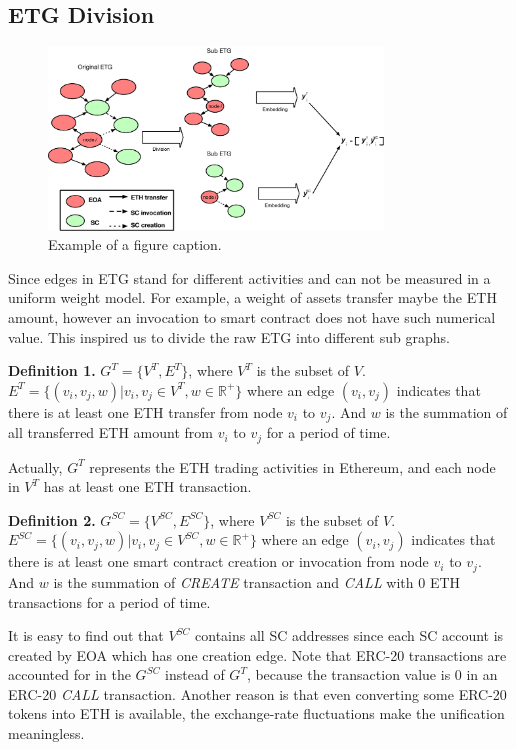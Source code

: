 \subsection{ETG Division}

\begin{figure}[htbp]
	\centering
	\label{fig_graph_split}
	\includegraphics[width=3.5in]{fig/graph_split.eps}
	\caption{Example of a figure caption.}
\end{figure}

Since edges in ETG stand for different activities and can not be measured in a uniform weight model. For example, a weight of assets transfer maybe the ETH amount, however an invocation to smart contract does not have such numerical value. This inspired us to divide the raw ETG into different sub graphs.

\textbf{Definition 1.} $G^{T}=\{V^T,E^T\}$, where $V^T$ is the subset of $V$. $E^T=\{(v_i,v_j,w)|v_i,v_j \in V^T,w \in \mathbb{R^+}\}$ where an edge $(v_i,v_j)$ indicates that there is at least one ETH transfer from node $v_i$ to $v_j$. And $w$ is the summation of all transferred ETH amount from $v_i$ to $v_j$ for a period of time.

Actually, $G^T$ represents the ETH trading activities in Ethereum, and each node in $V^T$ has at least one ETH transaction.

\textbf{Definition 2.} $G^{SC}=\{V^{SC},E^{SC}\}$, where $V^{SC}$ is the subset of $V$. $E^{SC}=\{(v_i,v_j,w)|v_i,v_j \in V^{SC},w \in \mathbb{R^+}\}$ where an edge $(v_i,v_j)$ indicates that there is at least one smart contract creation or invocation from node $v_i$ to $v_j$. And $w$ is the summation of \emph{CREATE} transaction and \emph{CALL} with $0$ ETH transactions for a period of time. 

It is easy to find out that $V^{SC}$ contains all SC addresses since each SC account is created by EOA which has one creation edge. Note that ERC-20 transactions are accounted for in the $G^{SC}$ instead of $G^T$, because the transaction value is $0$ in an ERC-20 \emph{CALL} transaction. Another reason is that even converting some ERC-20 tokens into ETH is available, the exchange-rate fluctuations make the unification meaningless.

